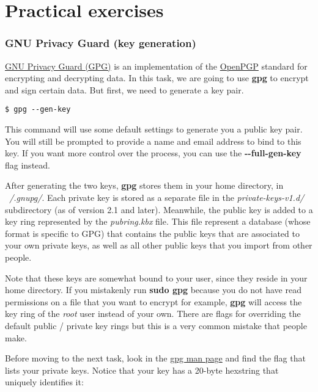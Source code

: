 \newpage

\section{Practical exercises}

\subsubsection{GNU Privacy Guard (key generation)}

\href{https://man.archlinux.org/man/gpg.1.en}{GNU Privacy Guard (GPG)} is an
implementation of the \href{https://www.rfc-editor.org/rfc/rfc4880}{OpenPGP}
standard for encrypting and decrypting data. In this task, we are going to use
\textbf{gpg} to encrypt and sign certain data. But first, we need to generate
a key pair.

\begin{lstlisting}[style=bashstyle]
$ gpg --gen-key
\end{lstlisting}

This command will use some default settings to generate you a public key pair.
You will still be prompted to provide a name and email address to bind to this
key. If you want more control over the process, you can use the
\textbf{-{-}full-gen-key} flag instead.

After generating the two keys, \textbf{gpg} stores them in your home directory,
in \textit{~/.gnupg/}. Each private key is stored as a separate file in the
\textit{private-keys-v1.d/} subdirectory (as of version 2.1 and later).
Meanwhile, the public key is added to a key ring represented by the
\textit{pubring.kbx} file. This file represent a database (whose format is
specific to GPG) that contains the public keys that are associated to your own
private keys, as well as all other public keys that you import from other
people.

Note that these keys are somewhat bound to your user, since they reside in your
home directory. If you mistakenly run \textbf{sudo gpg} because you do not have
read permissions on a file that you want to encrypt for example, \textbf{gpg}
will access the key ring of the \textit{root} user instead of your own. There
are flags for overriding the default public / private key rings but this is a
very common mistake that people make.

Before moving to the next task, look in the
\href{https://man.archlinux.org/man/gpg.1.en}{gpg man page} and find the flag
that lists your private keys. Notice that your key has a 20-byte hexstring that
uniquely identifies it:

